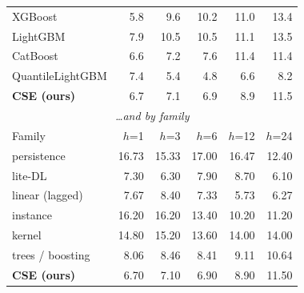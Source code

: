 \begin{tabular}{lrrrrr}
XGBoost & 5.8 & 9.6 & 10.2 & 11.0 & 13.4 \\
LightGBM & 7.9 & 10.5 & 10.5 & 11.1 & 13.5 \\
CatBoost & 6.6 & 7.2 & 7.6 & 11.4 & 11.4 \\
QuantileLightGBM & 7.4 & 5.4 & 4.8 & 6.6 & 8.2 \\
\textbf{CSE (ours)} & 6.7 & 7.1 & 6.9 & 8.9 & 11.5 \\
\midrule
\multicolumn{6}{c}{\emph{\ldots and by family}} \\
Family & $h$=1 & $h$=3 & $h$=6 & $h$=12 & $h$=24 \\
\midrule
persistence & 16.73 & 15.33 & 17.00 & 16.47 & 12.40 \\
lite-DL & 7.30 & 6.30 & 7.90 & 8.70 & 6.10 \\
linear (lagged) & 7.67 & 8.40 & 7.33 & 5.73 & 6.27 \\
instance & 16.20 & 16.20 & 13.40 & 10.20 & 11.20 \\
kernel & 14.80 & 15.20 & 13.60 & 14.00 & 14.00 \\
trees / boosting & 8.06 & 8.46 & 8.41 & 9.11 & 10.64 \\
\textbf{CSE (ours)} & 6.70 & 7.10 & 6.90 & 8.90 & 11.50 \\
\bottomrule
\end{tabular}
